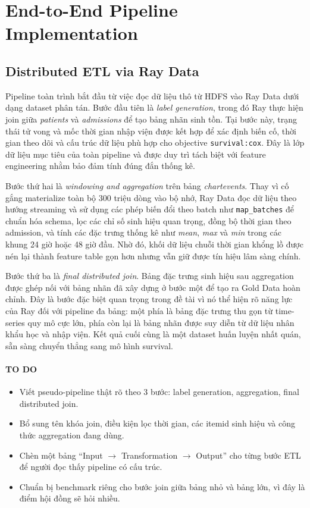 \section{End-to-End Pipeline Implementation}

\subsection{Distributed ETL via Ray Data}
Pipeline toàn trình bắt đầu từ việc đọc dữ liệu thô từ HDFS vào Ray Data dưới dạng dataset phân tán. Bước đầu tiên là \textit{label generation}, trong đó Ray thực hiện join giữa \textit{patients} và \textit{admissions} để tạo bảng nhãn sinh tồn. Tại bước này, trạng thái tử vong và mốc thời gian nhập viện được kết hợp để xác định biến cố, thời gian theo dõi và cấu trúc dữ liệu phù hợp cho objective \texttt{survival:cox}. Đây là lớp dữ liệu mục tiêu của toàn pipeline và được duy trì tách biệt với feature engineering nhằm bảo đảm tính đúng đắn thống kê.

Bước thứ hai là \textit{windowing and aggregation} trên bảng \textit{chartevents}. Thay vì cố gắng materialize toàn bộ 300 triệu dòng vào bộ nhớ, Ray Data đọc dữ liệu theo hướng streaming và sử dụng các phép biến đổi theo batch như \texttt{map\_batches} để chuẩn hóa schema, lọc các chỉ số sinh hiệu quan trọng, đồng bộ thời gian theo admission, và tính các đặc trưng thống kê như \textit{mean}, \textit{max} và \textit{min} trong các khung 24 giờ hoặc 48 giờ đầu. Nhờ đó, khối dữ liệu chuỗi thời gian khổng lồ được nén lại thành feature table gọn hơn nhưng vẫn giữ được tín hiệu lâm sàng chính.

Bước thứ ba là \textit{final distributed join}. Bảng đặc trưng sinh hiệu sau aggregation được ghép nối với bảng nhãn đã xây dựng ở bước một để tạo ra Gold Data hoàn chỉnh. Đây là bước đặc biệt quan trọng trong đề tài vì nó thể hiện rõ năng lực của Ray đối với pipeline đa bảng: một phía là bảng đặc trưng thu gọn từ time-series quy mô cực lớn, phía còn lại là bảng nhãn được suy diễn từ dữ liệu nhân khẩu học và nhập viện. Kết quả cuối cùng là một dataset huấn luyện nhất quán, sẵn sàng chuyển thẳng sang mô hình survival.

\paragraph{TO DO}
\begin{itemize}
    \item Viết pseudo-pipeline thật rõ theo 3 bước: label generation, aggregation, final distributed join.
    \item Bổ sung tên khóa join, điều kiện lọc thời gian, các itemid sinh hiệu và công thức aggregation đang dùng.
    \item Chèn một bảng ``Input $\rightarrow$ Transformation $\rightarrow$ Output'' cho từng bước ETL để người đọc thấy pipeline có cấu trúc.
    \item Chuẩn bị benchmark riêng cho bước join giữa bảng nhỏ và bảng lớn, vì đây là điểm hội đồng sẽ hỏi nhiều.
\end{itemize}

